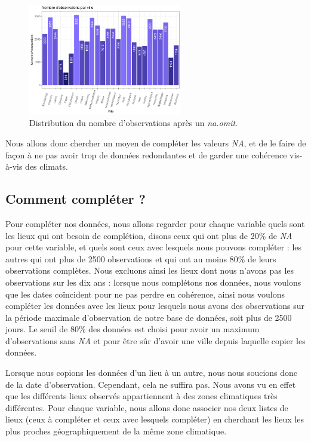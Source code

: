 \documentclass{article}
\begin{document}
\begin{figure}[htp]
    \centering
    \includegraphics[width=0.6\textwidth]{Images/distribution_lieux_raw.png}
    \caption{Distribution du nombre d'observations après un \emph{na.omit}.}
    \label{fig:distrib_raw}
\end{figure}

Nous allons donc chercher un moyen de compléter les valeurs \emph{NA}, et de le faire de façon à ne pas avoir trop de données redondantes et de garder une cohérence vis-à-vis des climats.

\subsection{Comment compléter ?}

Pour compléter nos données, nous allons regarder pour chaque variable quels sont les lieux qui ont besoin de complétion, disons ceux qui ont plus de 20\% de \emph{NA} pour cette variable, et quels sont ceux avec lesquels nous pouvons compléter : les autres qui ont plus de 2500 observations et qui ont au moins 80\% de leurs observations complètes. Nous excluons ainsi les lieux dont nous n'avons pas les observations sur les dix ans : lorsque nous complétons nos données, nous voulons que les dates coïncident pour ne pas perdre en cohérence, ainsi nous voulons compléter les données avec les lieux pour lesquels nous avons des observations sur la période maximale d'observation de notre base de données, soit plus de 2500 jours. Le seuil de 80\% des données est choisi pour avoir un maximum d'observations sans \emph{NA} et pour être sûr d'avoir une ville depuis laquelle copier les données.

Lorsque nous copions les données d'un lieu à un autre, nous nous soucions donc de la date d'observation. Cependant, cela ne suffira pas. Nous avons vu en effet que les différents lieux observés appartiennent à des zones climatiques très différentes. Pour chaque variable, nous allons donc associer nos deux listes de lieux (ceux à compléter et ceux avec lesquels compléter) en cherchant les lieux les plus proches géographiquement de la même zone climatique. 
\end{document}
